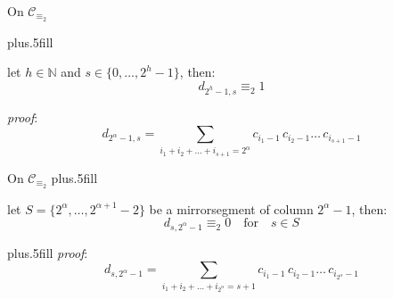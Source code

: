 \documentclass[10pt,serif, professionalfont]{beamer}
\begin{document}
\begin{frame}{On $\mathcal{C}_{\equiv_{2}}$}

      \vskip-20pt plus.5fill
    \begin{theorem}
        let $h\in\mathbb{N}$ and $s\in\lbrace0,\ldots,2^{h}-1 \rbrace$, then:
        \begin{displaymath}
            d_{2^{h}-1,s} \equiv_{2} 1
        \end{displaymath}
    \end{theorem}
    \emph{proof}: 
        \begin{displaymath}
            d_{2^{\alpha}-1,s} = \sum_{i_{1}+i_{2}+\ldots+i_{s+1}=2^{\alpha}}
                {c_{i_{1}-1}\,c_{i_{2}-1}\ldots\,c_{i_{s+1}-1}}
        \end{displaymath}

    
\end{frame}

\begin{frame}{On $\mathcal{C}_{\equiv_{2}}$}
      \vskip-15pt plus.5fill
    \begin{theorem}
        let  $S=\lbrace2^{\alpha},\ldots,2^{\alpha+1}-2\rbrace$ be a 
        \flqq mirror\frqq segment of column $2^{\alpha}-1$, then:
        \begin{displaymath} 
            d_{s,2^{\alpha}-1}\equiv_{2}0\quad\text{for}\quad s\in S
        \end{displaymath} 
    \end{theorem}
      \vskip-10pt plus.5fill
    \emph{proof}: 
        \begin{displaymath} 
            d_{s, 2^{\alpha}-1} = \sum_{i_{1}+i_{2}+\ldots+i_{2^{\alpha}}=s+1}
                {c_{i_{1}-1}\,c_{i_{2}-1}\ldots\,c_{i_{2^{\alpha}}-1}}
        \end{displaymath} 
    
    
        
\end{frame}
\end{document}
